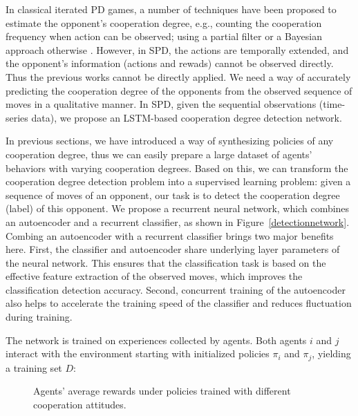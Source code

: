 \documentclass{article}
\begin{document}
In classical iterated PD games, a number of techniques have been proposed to estimate the opponent's cooperation degree, e.g., counting the cooperation frequency when action can be observed; using a partial filter or a Bayesian approach otherwise \cite{damer2008achieving,hernandez2016bayesian,Hernandez2016Identifying,leibo2017multi}. However, in SPD, the actions are temporally extended, and the opponent's information (actions and rewads) cannot be observed directly. Thus the previous works cannot be directly applied. We need a way of accurately predicting the cooperation degree of the opponents from the observed sequence of moves in a qualitative manner. In SPD, given the sequential observations (time-series data), we propose an LSTM-based cooperation degree detection network.

In previous sections, we have introduced a way of synthesizing policies of any cooperation degree, thus we can easily prepare a large dataset of agents' behaviors with varying cooperation degrees. Based on this, we can transform the cooperation degree detection problem into a supervised learning problem: given a sequence of moves of an opponent, our task is to detect the cooperation degree (label) of this opponent. We propose a recurrent neural network, which combines an autoencoder and a recurrent classifier, as shown in Figure~\ref{detectionnetwork}.  Combing an autoencoder with a recurrent classifier brings two major benefits here. First, the classifier and autoencoder share underlying layer parameters of the neural network. This ensures that the classification task is based on the effective feature extraction of the observed moves, which improves the classification detection accuracy. Second, concurrent training of the autoencoder also helps to accelerate the training speed of the classifier and reduces fluctuation during training.

The network is trained on experiences collected by agents. Both agents $i$ and $j$ interact with the environment starting with initialized policies $\pi_i$ and $\pi_j$, yielding a training set $D$:

\begin{figure}[tp]
\centering
{}
\caption{ Agents' average rewards under policies trained with different cooperation attitudes. }
\label{baseline}
\end{figure}
\end{document}

